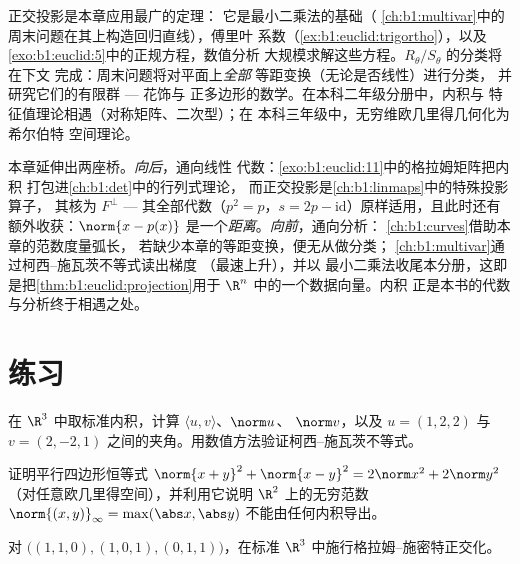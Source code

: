 \begin{remark}[内积的应用]
\label{rem:b1:euclid:whereused}
正交投影是本章应用最广的定理：
它是最小二乘法的基础（
\cref{ch:b1:multivar}中的周末问题在其上构造回归直线），傅里叶
系数（\cref{ex:b1:euclid:trigortho}），以及
\cref{exo:b1:euclid:5}中的正规方程，数值分析
大规模求解这些方程。$R_\theta / S_\theta$ 的分类将在下文
完成：周末问题将对平面上\emph{全部}
等距变换（无论是否线性）进行分类，
并研究它们的有限群 --- 花饰与
正多边形的数学。在本科二年级分册中，内积与
特征值理论相遇（对称矩阵、二次型）；在
本科三年级中，无穷维欧几里得几何化为希尔伯特
空间理论。
\end{remark}

\begin{remark}[第 3 册内的几个视角]
\label{rem:b1:euclid:perspectives}
本章延伸出两座桥。\emph{向后}，通向线性
代数：\cref{exo:b1:euclid:11}中的格拉姆矩阵把内积
打包进\cref{ch:b1:det}中的行列式理论，
而正交投影是\cref{ch:b1:linmaps}中的特殊投影算子，
其核为
$F^\perp$ --- 其全部代数（$p^2 = p$，$s = 2p -
\mathrm{id}$）原样适用，且此时还有额外收获：$\norm{x
- p(x)}$ 是一个\emph{距离}。\emph{向前}，通向分析：
\cref{ch:b1:curves}借助本章的范数度量弧长，
若缺少本章的等距变换，便无从做分类；
\cref{ch:b1:multivar}通过柯西–施瓦茨不等式读出梯度
（最速上升），并以
最小二乘法收尾本分册，这即是把\cref{thm:b1:euclid:projection}用于
$\R^n$ 中的一个数据向量。内积
正是本书的代数与分析终于相遇之处。
\end{remark}

\section{练习}

\begin{exercise}[$\star$]\label{exo:b1:euclid:1}
在 $\R^3$ 中取标准内积，计算 $\langle u, v\rangle$、$\norm u$、
$\norm v$，以及 $u = (1, 2, 2)$ 与 $v = (2, -2,
1)$ 之间的夹角。用数值方法验证柯西–施瓦茨不等式。
\end{exercise}

\begin{exercise}[$\star$]\label{exo:b1:euclid:2}
证明平行四边形恒等式 $\norm{x+y}^2 + \norm{x-y}^2 =
2\norm x^2 + 2\norm y^2$（对任意欧几里得空间），并利用它说明
$\R^2$ 上的无穷范数 $\norm{(x,y)}_\infty = \max(\abs x,
\abs y)$ 不能由任何内积导出。
\end{exercise}

\begin{exercise}[$\star$]\label{exo:b1:euclid:3}
对 $\bigl((1,1,0), (1,0,1), (0,1,1)\bigr)$，在标准
$\R^3$ 中施行格拉姆–施密特正交化。
\end{exercise}

